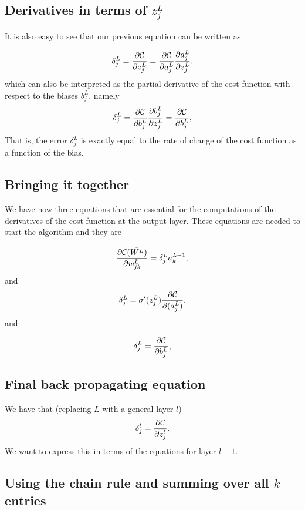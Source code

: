 \documentclass[%
oneside,                 %
final,                   %
10pt]{article}
\begin{document}
\subsection{Derivatives in terms of $z_j^L$}

It is also easy to see that our previous equation can be written as

\[
\delta_j^L =\frac{\partial {\cal C}}{\partial z_j^L}= \frac{\partial {\cal C}}{\partial a_j^L}\frac{\partial a_j^L}{\partial z_j^L},
\]
which can also be interpreted as the partial derivative of the cost function with respect to the biases $b_j^L$, namely
\[
\delta_j^L = \frac{\partial {\cal C}}{\partial b_j^L}\frac{\partial b_j^L}{\partial z_j^L}=\frac{\partial {\cal C}}{\partial b_j^L},
\]
That is, the error $\delta_j^L$ is exactly equal to the rate of change of the cost function as a function of the bias. 

\subsection{Bringing it together}

We have now three equations that are essential for the computations of the derivatives of the cost function at the output layer. These equations are needed to start the algorithm and they are

\begin{equation}
\frac{\partial{\cal C}(\hat{W^L})}{\partial w_{jk}^L}  =  \delta_j^La_k^{L-1},
\end{equation}
and
\begin{equation}
\delta_j^L = \sigma'(z_j^L)\frac{\partial {\cal C}}{\partial (a_j^L)},
\end{equation}
and

\begin{equation}
\delta_j^L = \frac{\partial {\cal C}}{\partial b_j^L},
\end{equation}

\subsection{Final back propagating equation}

We have that (replacing $L$ with a general layer $l$)
\[
\delta_j^l =\frac{\partial {\cal C}}{\partial z_j^l}.
\]
We want to express this in terms of the equations for layer $l+1$.

\subsection{Using the chain rule and summing over all $k$ entries}
\end{document}

